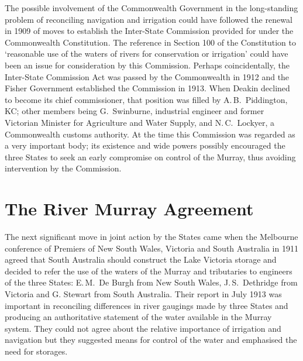 The possible involvement of the Commonwealth Government in the
long-standing problem of reconciling navigation and irrigation could
have followed the renewal in 1909 of moves to establish the
Inter-State Commission provided for under the Commonwealth
Constitution.  The reference in Section 100 of the Constitution
 to `reasonable use of the waters of
rivers for conservation or irrigation' could have been an issue for
consideration by this Commission.  Perhaps coincidentally, the
Inter-State Commission Act  was passed by the Commonwealth in 1912 and the Fisher
Government established the Commission in 1913.  When Deakin
  declined
to become its chief commissioner, that position was filled by
A.\,B.~Piddington, KC;  other members being
G.~Swinburne,  industrial engineer and former
Victorian Minister for Agriculture and Water Supply, and
N.\,C.~Lockyer,  a Commonwealth customs
authority.  At the time this Commission was regarded as a very
important body; its existence and wide powers possibly encouraged the
three States to seek an early compromise on control of the Murray,
thus avoiding intervention by the Commission.

\section*{The River Murray Agreement}

The next significant move in joint action by the States came when the
Melbourne conference of Premiers of New South Wales, Victoria and
South Australia in 1911  agreed that
South Australia should construct the Lake Victoria
 storage and decided to refer the use of the
waters of the Murray and tributaries to engineers of the three States:
E.\,M.~De Burgh  from New South Wales,
J.\,S.~Dethridge  from Victoria and
G. Stewart  from South Australia.  Their report in
July 1913 was important in reconciling differences in river gaugings
made by three States and producing an authoritative statement of the
water available in the Murray system.  They could not agree about the
relative importance of irrigation and navigation but they suggested
means for control of the water and emphasised the need for
storages.

